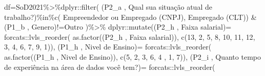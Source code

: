 \documentclass[
]{article}
\newenvironment{Shaded}{\begin{snugshade}}{\end{snugshade}}
\newcommand{\AttributeTok}[1]{\textcolor[rgb]{0.77,0.63,0.00}{#1}}
\newcommand{\DecValTok}[1]{\textcolor[rgb]{0.00,0.00,0.81}{#1}}
\newcommand{\FunctionTok}[1]{\textcolor[rgb]{0.00,0.00,0.00}{#1}}
\newcommand{\NormalTok}[1]{#1}
\newcommand{\OtherTok}[1]{\textcolor[rgb]{0.56,0.35,0.01}{#1}}
\newcommand{\SpecialCharTok}[1]{\textcolor[rgb]{0.00,0.00,0.00}{#1}}
\newcommand{\StringTok}[1]{\textcolor[rgb]{0.31,0.60,0.02}{#1}}
\begin{document}
\begin{Shaded}
\begin{Highlighting}[]
\NormalTok{df}\OtherTok{=}\NormalTok{SoD2021}\SpecialCharTok{\%\textgreater{}\%}\NormalTok{dplyr}\SpecialCharTok{::}\FunctionTok{filter}\NormalTok{(}
  \StringTok{\textasciigrave{}}\AttributeTok{(\textquotesingle{}P2\_a \textquotesingle{}, \textquotesingle{}Qual sua situação atual de trabalho?\textquotesingle{})}\StringTok{\textasciigrave{}}\SpecialCharTok{\%in\%}\FunctionTok{c}\NormalTok{(}
    \StringTok{\textquotesingle{}Empreendedor ou Empregado (CNPJ)\textquotesingle{}}\NormalTok{, }\StringTok{\textquotesingle{}Empregado (CLT)\textquotesingle{}}\NormalTok{) }\SpecialCharTok{\&}
    \StringTok{\textasciigrave{}}\AttributeTok{(\textquotesingle{}P1\_b \textquotesingle{}, \textquotesingle{}Genero\textquotesingle{})}\StringTok{\textasciigrave{}}\SpecialCharTok{!=}\StringTok{\textquotesingle{}Outro\textquotesingle{}}\NormalTok{ )}\SpecialCharTok{\%\textgreater{}\%}
\NormalTok{  dplyr}\SpecialCharTok{::}\FunctionTok{mutate}\NormalTok{(}\StringTok{\textasciigrave{}}\AttributeTok{(\textquotesingle{}P2\_h \textquotesingle{}, \textquotesingle{}Faixa salarial\textquotesingle{})}\StringTok{\textasciigrave{}}\OtherTok{=}\NormalTok{ forcats}\SpecialCharTok{::}\FunctionTok{lvls\_reorder}\NormalTok{(}
  \FunctionTok{as.factor}\NormalTok{(}\StringTok{\textasciigrave{}}\AttributeTok{(\textquotesingle{}P2\_h \textquotesingle{}, \textquotesingle{}Faixa salarial\textquotesingle{})}\StringTok{\textasciigrave{}}\NormalTok{),}
  \FunctionTok{c}\NormalTok{(}\DecValTok{13}\NormalTok{, }\DecValTok{2}\NormalTok{, }\DecValTok{5}\NormalTok{, }\DecValTok{8}\NormalTok{, }\DecValTok{10}\NormalTok{, }\DecValTok{11}\NormalTok{, }\DecValTok{12}\NormalTok{, }\DecValTok{3}\NormalTok{, }\DecValTok{4}\NormalTok{, }\DecValTok{6}\NormalTok{, }\DecValTok{7}\NormalTok{, }\DecValTok{9}\NormalTok{, }\DecValTok{1}\NormalTok{)),}
  \StringTok{\textasciigrave{}}\AttributeTok{(\textquotesingle{}P1\_h \textquotesingle{}, \textquotesingle{}Nivel de Ensino\textquotesingle{})}\StringTok{\textasciigrave{}}\OtherTok{=}\NormalTok{ forcats}\SpecialCharTok{::}\FunctionTok{lvls\_reorder}\NormalTok{(}
    \FunctionTok{as.factor}\NormalTok{(}\StringTok{\textasciigrave{}}\AttributeTok{(\textquotesingle{}P1\_h \textquotesingle{}, \textquotesingle{}Nivel de Ensino\textquotesingle{})}\StringTok{\textasciigrave{}}\NormalTok{), }\FunctionTok{c}\NormalTok{(}\DecValTok{5}\NormalTok{, }\DecValTok{2}\NormalTok{, }\DecValTok{3}\NormalTok{, }\DecValTok{6}\NormalTok{, }\DecValTok{4}\NormalTok{ , }\DecValTok{1}\NormalTok{, }\DecValTok{7}\NormalTok{)),}
  \StringTok{\textasciigrave{}}\AttributeTok{(\textquotesingle{}P2\_i \textquotesingle{}, \textquotesingle{}Quanto tempo de experiência na área de dados você tem?\textquotesingle{})}\StringTok{\textasciigrave{}}\OtherTok{=}\NormalTok{ forcats}\SpecialCharTok{::}\FunctionTok{lvls\_reorder}\NormalTok{(}

\end{Highlighting}
\end{Shaded}
\end{document}
